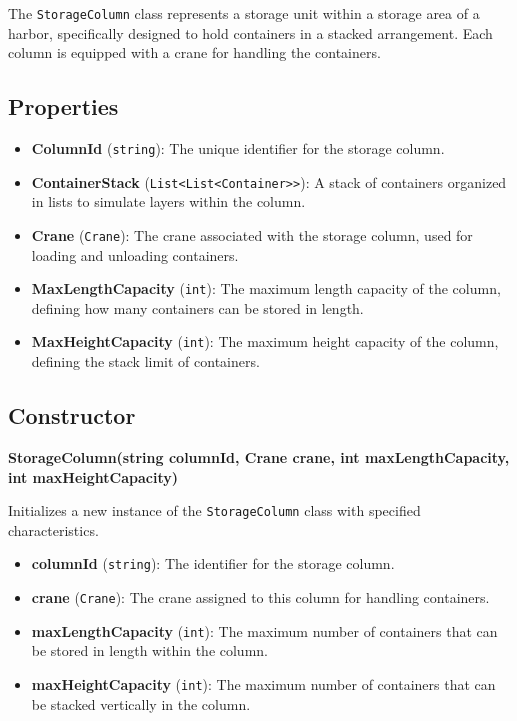 \documentclass[12pt]{article}
\begin{document}
The \texttt{StorageColumn} class represents a storage unit within a storage area of a harbor, specifically designed to hold containers in a stacked arrangement. Each column is equipped with a crane for handling the containers.

\subsection*{Properties}

\begin{itemize}
    \item \textbf{ColumnId} (\texttt{string}): The unique identifier for the storage column.
    \item \textbf{ContainerStack} (\texttt{List<List<Container>>}): A stack of containers organized in lists to simulate layers within the column.
    \item \textbf{Crane} (\texttt{Crane}): The crane associated with the storage column, used for loading and unloading containers.
    \item \textbf{MaxLengthCapacity} (\texttt{int}): The maximum length capacity of the column, defining how many containers can be stored in length.
    \item \textbf{MaxHeightCapacity} (\texttt{int}): The maximum height capacity of the column, defining the stack limit of containers.
\end{itemize}

\subsection*{Constructor}

\textbf{StorageColumn(string columnId, Crane crane, int maxLengthCapacity, int maxHeightCapacity)}

Initializes a new instance of the \texttt{StorageColumn} class with specified characteristics.

\begin{itemize}
    \item \textbf{columnId} (\texttt{string}): The identifier for the storage column.
    \item \textbf{crane} (\texttt{Crane}): The crane assigned to this column for handling containers.
    \item \textbf{maxLengthCapacity} (\texttt{int}): The maximum number of containers that can be stored in length within the column.
    \item \textbf{maxHeightCapacity} (\texttt{int}): The maximum number of containers that can be stacked vertically in the column.
\end{itemize}
\end{document}
